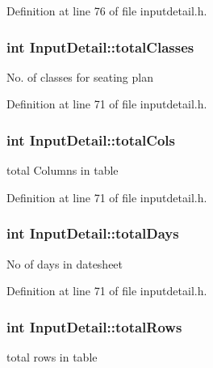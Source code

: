 \-Definition at line 76 of file inputdetail.\-h.

\hypertarget{classInputDetail_aac4c49f5453d86c4c79bcb87361ad28d}{
\subsubsection[{total\-Classes}]{\setlength{\rightskip}{0pt plus 5cm}int {\bf \-Input\-Detail\-::total\-Classes}}}\label{classInputDetail_aac4c49f5453d86c4c79bcb87361ad28d}
\-No. of classes for seating plan 

\-Definition at line 71 of file inputdetail.\-h.

\hypertarget{classInputDetail_aeba19a14044746fd0c87b356d05d88c0}{
\subsubsection[{total\-Cols}]{\setlength{\rightskip}{0pt plus 5cm}int {\bf \-Input\-Detail\-::total\-Cols}}}\label{classInputDetail_aeba19a14044746fd0c87b356d05d88c0}
total \-Columns in table 

\-Definition at line 71 of file inputdetail.\-h.

\hypertarget{classInputDetail_a8d1ba029791bb9b87330400d82cdbcde}{
\subsubsection[{total\-Days}]{\setlength{\rightskip}{0pt plus 5cm}int {\bf \-Input\-Detail\-::total\-Days}}}\label{classInputDetail_a8d1ba029791bb9b87330400d82cdbcde}
\-No of days in datesheet 

\-Definition at line 71 of file inputdetail.\-h.

\hypertarget{classInputDetail_a3710702eafae009629e99f1dc76d5285}{
\subsubsection[{total\-Rows}]{\setlength{\rightskip}{0pt plus 5cm}int {\bf \-Input\-Detail\-::total\-Rows}}}\label{classInputDetail_a3710702eafae009629e99f1dc76d5285}
total rows in table 

